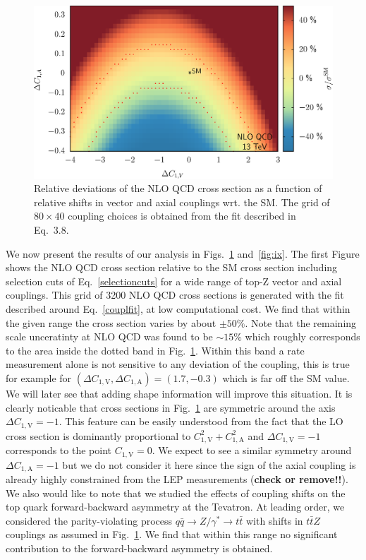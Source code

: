 \documentclass[preprint]{JHEP3}
\def\ttbZ{t\bar{t}Z}
\def\ttb{t\bar{t}}
\def\ConeA{C_{1,\mathrm{A}}}
\def\ConeV{C_{1,\mathrm{V}}}
\begin{document}
\begin{figure}[t]
\centering
\includegraphics[scale=0.6]{LHC_53_SigmaNLO.eps}
\caption{ \label{fig:viii} Relative deviations of the NLO QCD cross section as a function of relative shifts in vector and axial couplings wrt. the SM.
The grid of $ 80 \times 40 $ coupling choices is obtained from the fit described in Eq.~3.8. }
\end{figure}

We now present the results of our analysis in Figs.~\ref{fig:viii} and~\ref{fig:ix}.
The first Figure shows the NLO QCD cross section relative to the SM cross section 
including selection cuts of Eq.~\ref{selectioncuts} for a wide range of top-Z vector and axial couplings.
This grid of 3200 NLO QCD cross sections is generated with the fit described around Eq.~\ref{couplfit}, at low computational cost.
We find that within the given range the cross section varies by about $\pm 50\%$.
Note that the remaining scale unceratinty at NLO QCD was found to be $\sim 15\%$ which roughly corresponds to the area inside the dotted band in Fig.~\ref{fig:viii}.
Within this band a rate measurement alone is not sensitive to any deviation of the coupling, this is true for example for $(\Delta\ConeV,\Delta\ConeA)=(1.7,-0.3)$ which is far off the SM value.
We will later see that adding shape information will improve this situation.
It is clearly noticable that cross sections in Fig.~\ref{fig:viii} are symmetric around the axis $\Delta\ConeV=-1$. This feature can be easily understood
from the fact that the LO cross section is dominantly proportional to $\ConeV^2+\ConeA^2$ and $\Delta\ConeV=-1$ corresponds to the point $\ConeV=0$.
We expect to see a similar symmetry around $\Delta\ConeA=-1$ but we do not consider it here since the sign of the axial coupling is already highly constrained from 
the LEP measurements ({\bf check or remove!!}).
We also would like to note that we studied the effects of coupling shifts on the top quark forward-backward asymmetry at the Tevatron.
At leading order, we considered the parity-violating process $q \bar{q} \to Z/\gamma^* \to \ttb$ with shifts in $\ttbZ$ couplings as assumed in Fig.~\ref{fig:viii}.
We find that within this range no significant contribution to the forward-backward asymmetry is obtained.
\end{document}
